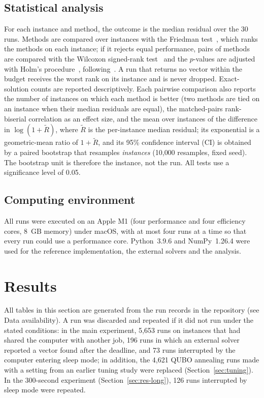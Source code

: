 \documentclass[pdflatex,sn-mathphys-num]{sn-jnl}
\theoremstyle{thmstyleone}
\theoremstyle{thmstylethree}
\begin{document}
\subsection{Statistical analysis}\label{sec:stats}
For each instance and method, the outcome is the median residual over the 30 runs. Methods are compared over instances with the Friedman test~\cite{friedman1937}, which ranks the methods on each instance; if it rejects equal performance, pairs of methods are compared with the Wilcoxon signed-rank test~\cite{wilcoxon1945} and the $p$-values are adjusted with Holm's procedure~\cite{holm1979}, following~\cite{demsar2006,derrac2011,benavoli2016}. A run that returns no vector within the budget receives the worst rank on its instance and is never dropped. Exact-solution counts are reported descriptively. Each pairwise comparison also reports the number of instances on which each method is better (two methods are tied on an instance when their median residuals are equal), the matched-pairs rank-biserial correlation as an effect size, and the mean over instances of the difference in $\log(1+\tilde R)$, where $\tilde R$ is the per-instance median residual; its exponential is a geometric-mean ratio of $1+\tilde R$, and its 95\% confidence interval (CI) is obtained by a paired bootstrap that resamples \emph{instances} (10{,}000 resamples, fixed seed). The bootstrap unit is therefore the instance, not the run. All tests use a significance level of 0.05.

\subsection{Computing environment}
All runs were executed on an Apple M1 (four performance and four efficiency cores, 8~GB memory) under macOS, with at most four runs at a time so that every run could use a performance core. Python~3.9.6 and NumPy~1.26.4 were used for the reference implementation, the external solvers and the analysis.

\section{Results}\label{sec:results}

All tables in this section are generated from the run records in the repository (see Data availability). A run was discarded and repeated if it did not run under the stated conditions: in the main experiment, 5{,}653 runs on instances that had shared the computer with another job, 196 runs in which an external solver reported a vector found after the deadline, and 73 runs interrupted by the computer entering sleep mode; in addition, the 4{,}621 QUBO annealing runs made with a setting from an earlier tuning study were replaced (Section~\ref{sec:tuning}). In the 300-second experiment (Section~\ref{sec:res-long}), 126 runs interrupted by sleep mode were repeated.
\end{document}
